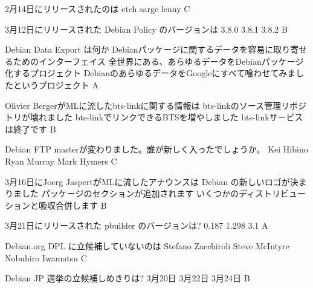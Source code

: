 
 \santaku
 {2月14日にリリースされたのは}
 {etch}
 {sarge}
 {lenny}
 {C}
{}

 \santaku
 {3月12日にリリースされた Debian Policy のバージョンは}
 {3.8.0}
 {3.8.1}
 {3.8.2}
 {B}
{}

 \santaku
 {Debian Data Export は何か}
 {Debianパッケージに関するデータを容易に取り寄せるためのインターフェイス}
 {全世界にある、あらゆるデータをDebianパッケージ化するプロジェクト}
 {DebianのあらゆるデータをGoogleにすべて喰わせてみましたというプロジェクト}
 {A}
{}

 \santaku
 {Olivier BergerがMLに流したbts-linkに関する情報は}
 {bts-linkのソース管理リポジトリが壊れました}
 {bts-linkでリンクできるBTSを増やしました}
 {bts-linkサービスは終了です}
 {B}
{}

 \santaku
 {Debian FTP masterが変わりました。誰が新しく入ったでしょうか。}
 {Kei Hibino}
 {Ryan Murray}%
 {Mark Hymers}%
 {C}
{}

 \santaku
 {3月16日にJoerg JaspertがMLに流したアナウンスは}
 {Debian の新しいロゴが決まりました}
 {パッケージのセクションが追加されます}
 {いくつかのディストリビューションと吸収合併します}
 {B}
{}

 \santaku
 {3月21日にリリースされた pbuilder のバージョンは?}
 {0.187}
 {1.298}
 {3.1}
 {A}
{}

 \santaku
 {Debian.org DPL に立候補していないのは}
 {Stefano Zacchiroli}
 {Steve McIntyre}
 {Nobuhiro Iwamatsu}
 {C}
{}

 \santaku
 {Debian JP 選挙の立候補しめきりは?}
 {3月20日}
 {3月22日}
 {3月24日}
 {B}
{}

